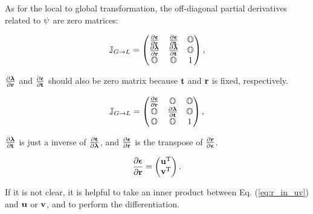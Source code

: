 \documentclass[12pt,a4paper]{scrarticle}
\begin{document}
As for the local to global transformation, the off-diagonal partial derivatives related to $\psi$ are zero matrices:

\begin{equation}\label{eq:jacobi4}
    \mathbb{J}_{G \rightarrow L} = 
    \begin{pmatrix}
     \frac{\partial{\boldsymbol{\epsilon}}}{\partial{\mathbf{r}}} & 
     \frac{\partial{\boldsymbol{\epsilon}}}{\partial{\mathbf{t}}}&  \mathbb{O} \\
     \frac{\partial{\boldsymbol{\lambda}}}{\partial{\mathbf{r}}} & 
     \frac{\partial{\boldsymbol{\lambda}}}{\partial{\mathbf{t}}}&  \mathbb{O} \\
     \mathbb{O} & 
     \mathbb{O} &  1
    \end{pmatrix},
\end{equation}

$\frac{\partial{\boldsymbol{\lambda}}}{\partial{\mathbf{r}}}$ and $\frac{\partial{\boldsymbol{\epsilon}}}{\partial{\mathbf{t}}}$ should also be zero matrix because $\mathbf{t}$ and $\mathbf{r}$ is fixed, respectively. 

\begin{equation}\label{eq:jacobi5}
    \mathbb{J}_{G \rightarrow L} = 
    \begin{pmatrix}
     \frac{\partial{\boldsymbol{\epsilon}}}{\partial{\mathbf{r}}} & \mathbb{O} &  \mathbb{O} \\
     \mathbb{O} & \frac{\partial{\boldsymbol{\lambda}}}{\partial{\mathbf{t}}} &  \mathbb{O} \\
     \mathbb{O} & \mathbb{O} & 1
    \end{pmatrix},
\end{equation}

$\frac{\partial{\boldsymbol{\lambda}}}{\partial{\mathbf{t}}}$ is just a inverse of $\frac{\partial{\mathbf{t}}}{\partial{\boldsymbol{\lambda}}}$, and $\frac{\partial{\boldsymbol{\epsilon}}}{\partial{\mathbf{r}}}$ is the transpose of $\frac{\partial{\mathbf{r}}}{\partial{\boldsymbol{\epsilon}}}$.

\begin{equation}\label{eq:dldr}
\frac{\partial{\boldsymbol{\epsilon}}}{\partial{\mathbf{r}}}=
    \begin{pmatrix}
     \mathbf{u}^{\mathrm{T}} \\
     \mathbf{v}^{\mathrm{T}}
    \end{pmatrix}.    
\end{equation}

If it is not clear, it is helpful to take an inner product between Eq. (\ref{eq:r_in_uv}) and $\mathbf{u}$ or $\mathbf{v}$, and to perform the differentiation.
\end{document}
